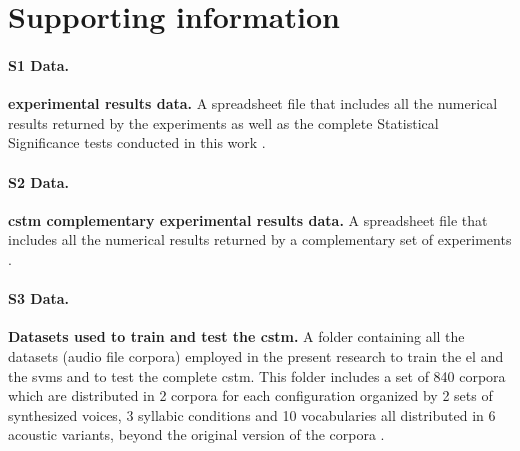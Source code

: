 \documentclass[10pt,letterpaper]{article}
\begin{document}



\section*{Supporting information}

\paragraph*{S1 Data.}
\label{S1_Data}
{\bf {} experimental results data.} A spreadsheet file that includes all the numerical results returned by the experiments as well as the complete Statistical Significance tests conducted in this work \cite{dematties_dario_2019_2654939}.

\paragraph*{S2 Data.}
\label{S2_Data}
{\bf \gls{cstm} complementary experimental results data.} A spreadsheet file that includes all the numerical results returned by a complementary set of experiments \cite{dematties_dario_2019_2654939}.

\paragraph*{S3 Data.}
\label{S3_Data}
{\bf Datasets used to train and test the \gls{cstm}.} A folder containing all the datasets (audio file corpora) employed in the present research to train the \gls{el} and the \glspl{svm} and to test the complete \gls{cstm}. This folder includes a set of 840 corpora which are distributed in 2 corpora for each configuration organized by 2 sets of synthesized voices, 3 syllabic conditions and 10 vocabularies all distributed in 6 acoustic variants, beyond the original version of the corpora \cite{dematties_dario_2019_2576130}.
\end{document}
